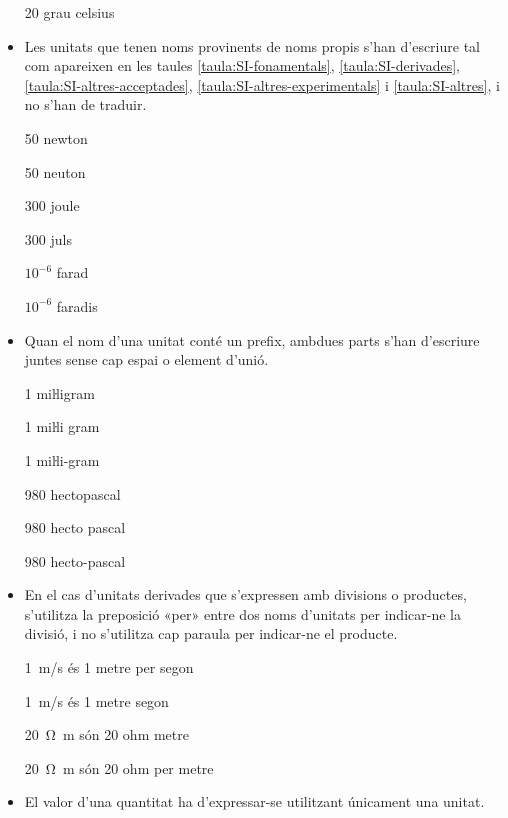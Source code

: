 \begin{itemize}
\textcolor{Red}\faTimesCircle{} 20 grau celsius


\item Les unitats que tenen noms provinents de noms propis s'han
d'escriure tal com apareixen en les taules
\vref{taula:SI-fonamentals}, \vref{taula:SI-derivades}, \vref{taula:SI-altres-acceptades}, \vref{taula:SI-altres-experimentals} i \vref{taula:SI-altres}, i no s'han
de traduir.

\textcolor{Green}\faCheckSquare{} 50 newton

\textcolor{Red}\faTimesCircle{}  50 neuton

\textcolor{Green}\faCheckSquare{} 300 joule

\textcolor{Red}\faTimesCircle{}  300 juls

\textcolor{Green}\faCheckSquare{} $10^{-6}$ farad

\textcolor{Red}\faTimesCircle{}  $10^{-6}$ faradis


 \item Quan el nom d'una unitat
conté un prefix, ambdues parts s'han d'escriure juntes sense cap espai o element d'unió.

\textcolor{Green}\faCheckSquare{} 1 miŀligram

\textcolor{Red}\faTimesCircle{} 1 miŀli gram

\textcolor{Red}\faTimesCircle{} 1 miŀli-gram

\textcolor{Green}\faCheckSquare{}  980 hectopascal

\textcolor{Red}\faTimesCircle{} 980 hecto pascal

\textcolor{Red}\faTimesCircle{} 980 hecto-pascal


\item En el cas  d'unitats derivades que s'expressen amb divisions o
productes, s'utilitza la preposició «per» entre dos noms d'unitats
per indicar-ne la divisió, i no s'utilitza cap paraula per indicar-ne el
producte.

\textcolor{Green}\faCheckSquare{} \SI{1}{m/s} és 1 metre per segon

\textcolor{Red}\faTimesCircle{}  \SI{1}{m/s} és 1 metre segon

 \textcolor{Green}\faCheckSquare{} \SI{20}{\ohm.m} són 20 ohm metre

\textcolor{Red}\faTimesCircle{}   \SI{20}{\ohm.m} són 20 ohm  per metre


\item El valor d'una quantitat ha d'expressar-se  utilitzant únicament una
unitat.


\end{itemize}
